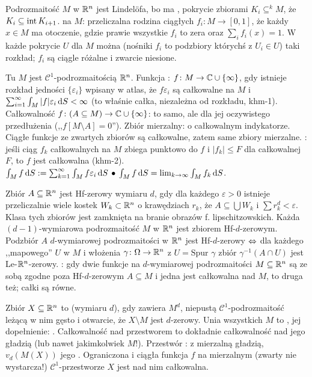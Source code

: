 Podrozmaitość $M$ w  $\mathbb{R}^n$ jest Lindelöfa, bo ma , pokrycie zbiorami $K_i \subseteq^k M$, że $K_i \subseteq \operatorname{int} K_{i+1}$.
 na $M$: przeliczalna rodzina 
ciągłych $f_i \colon M \to [0,1]$, że każdy $x \in M$ ma otoczenie, gdzie prawie wszystkie $f_i$ to zera oraz $\sum_i f_i(x) = 1$.
W każde  pokrycie $U$ dla $M$ można  (nośniki $f_i$ to podzbiory którychś z $U_i \in U$) taki rozkład; $f_i$ są ciągle różalne i zwarcie niesione.

Tu  $M$ jest $\mathscr C^1$-podrozmaitością $\mathbb{R}^n$.
Funkcja : $f \colon M \to \mathbb{C} \cup \{\infty\}$, gdy istnieje rozkład jedności $\{\varepsilon_i\}$ wpisany w atlas, że $f \varepsilon_i$ są całkowalne na $M$ i $\sum_{i=1}^\infty \int_M |f| \varepsilon_i \,\textrm{d} S < \infty$ (to właśnie całka, niezależna od rozkładu, khm-1).
Całkowalność $f \colon (A \subseteq M) \to \mathbb{C} \cup \{\infty\}$: to samo, ale dla jej oczywistego przedłużenia (,,$f[M \setminus A] = 0$'').
Zbiór mierzalny: o całkowalnym indykatorze.
Ciągłe funkcje ze zwartych zbiorów są całkowalne, zatem same zbiory mierzalne.
: jeśli ciąg $f_k$ całkowalnych na $M$ zbiega punktowo do $f$ i $|f_k| \le F$ dla całkowalnej $F$, to $f$ jest całkowalna (khm-2). 
$\int_M f\,\textrm{d} S := \sum_{k=1}^\infty \int_M f \varepsilon_i \,\textrm{d} S \, \bullet \, \int_M f\,\textrm{d} S = \lim_{k \to \infty} \int_M f_k \,\textrm{d} S$.

Zbiór  $A \subseteq \mathbb{R}^n$ jest Hf-zerowy wymiaru $d$, gdy dla każdego $\varepsilon > 0$ istnieje przeliczalnie wiele kostek $W_k \subset \mathbb{R}^n$ o krawędziach $r_k$, że $A \subseteq \bigcup W_k$ i $\sum r_k^d < \varepsilon$.
Klasa tych zbiorów jest zamknięta na branie obrazów f. lipschitzowskich.
Każda $(d-1)$-wymiarowa podrozmaitość $M$ w $\mathbb{R}^n$ jest zbiorem Hf-$d$-zerowym.
Podzbiór $A$ $d$-wymiarowej podrozmaitości w $\mathbb{R}^n$ jest Hf-$d$-zerowy $\Leftrightarrow$ dla każdego ,,mapowego'' $U$ w $M$ i włożenia $\gamma \colon \Omega \to \mathbb{R}^n$ z $U = \text{Spur } \gamma$ zbiór $\gamma^{-1}(A \cap U)$ jest Le-$\mathbb{R}^n$-zerowy.
: gdy dwie funkcje na $d$-wymiarowej podrozmaitości $M \subseteq \mathbb{R}^n$ są ze sobą zgodne poza Hf-$d$-zerowym $A \subseteq M$ i jedna jest całkowalna nad $M$, to druga też; całki są równe.

Zbiór  $X \subseteq \mathbb{R}^n$ to  (wymiaru $d$), gdy zawiera $M^d$, niepustą $\mathscr C^1$-podrozmaitość leżącą w nim gęsto i otwarcie, że $X \setminus M$ jest $d$-zerowy.
Unia wszystkich $M$ to , jej dopełnienie: .
Całkowalność nad przestworem to dokładnie całkowalność nad jego gładzią (lub nawet jakimkolwiek $M$!).
Przestwór : z mierzalną gładzią, $v_d(M(X))$ jego .
Ograniczona i ciągła funkcja $f$ na mierzalnym (zwarty nie wystarcza!) $\mathscr C^1$-przestworze $X$ jest nad nim całkowalna.